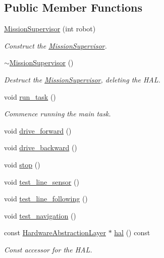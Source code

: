 \subsection*{Public Member Functions}
\begin{DoxyCompactItemize}
\item 
\hyperlink{classIDP_1_1MissionSupervisor_afc6a54e04718d919b2b48458a47304b2}{MissionSupervisor} (int robot)
\begin{DoxyCompactList}\small\item\em Construct the \hyperlink{classIDP_1_1MissionSupervisor}{MissionSupervisor}. \item\end{DoxyCompactList}\item 
\hyperlink{classIDP_1_1MissionSupervisor_aa43dab8c02cd596d0f5df6b3af5aade4}{$\sim$MissionSupervisor} ()
\begin{DoxyCompactList}\small\item\em Destruct the \hyperlink{classIDP_1_1MissionSupervisor}{MissionSupervisor}, deleting the HAL. \item\end{DoxyCompactList}\item 
void \hyperlink{classIDP_1_1MissionSupervisor_a06fc1fcf6272651d50938fd94306ac24}{run\_\-task} ()
\begin{DoxyCompactList}\small\item\em Commence running the main task. \item\end{DoxyCompactList}\item 
void \hyperlink{classIDP_1_1MissionSupervisor_af8c6a3073190a4479211753fe5f50a36}{drive\_\-forward} ()
\item 
void \hyperlink{classIDP_1_1MissionSupervisor_ae5d6e9a37417126da780583349b48d44}{drive\_\-backward} ()
\item 
void \hyperlink{classIDP_1_1MissionSupervisor_ad11e444b6be1d51c3339bd6397d45fd4}{stop} ()
\item 
void \hyperlink{classIDP_1_1MissionSupervisor_af147b0bec9464bb7e956a40a7f3d0fda}{test\_\-line\_\-sensor} ()
\item 
void \hyperlink{classIDP_1_1MissionSupervisor_a21be0b52e2f13c7fb373c90dae77ba23}{test\_\-line\_\-following} ()
\item 
void \hyperlink{classIDP_1_1MissionSupervisor_a7c0f8d9bc56e3ec9da1b1294fa828541}{test\_\-navigation} ()
\item 
const \hyperlink{classIDP_1_1HardwareAbstractionLayer}{HardwareAbstractionLayer} $\ast$ \hyperlink{classIDP_1_1MissionSupervisor_ae19d0c2123fda158cc45e649128fbc09}{hal} () const 
\begin{DoxyCompactList}\small\item\em Const accessor for the HAL. \item\end{DoxyCompactList}\end{DoxyCompactItemize}
